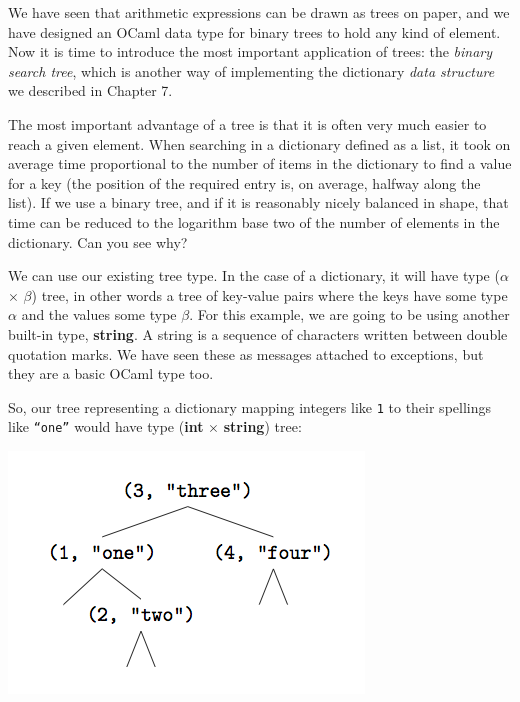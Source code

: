 \documentclass[]{book}
\newcommand{\smspace}{\vspace{4mm}}
\begin{document}
We have seen that arithmetic expressions can be drawn as trees on paper, and we have designed an OCaml data type for binary trees to hold any kind of element. Now it is time to introduce the most important application of trees: the \textit{binary search tree}, which is another way of implementing the dictionary \textit{data structure} we described in Chapter 7. 

The most important advantage of a tree is that it is often very much easier to reach a given element. When searching in a dictionary defined as a list, it took on average time proportional to the number of items in the dictionary to find a value for a key (the position of the required entry is, on average, halfway along the list). If we use a binary tree, and if it is reasonably nicely balanced in shape, that time can be reduced to the logarithm base two of the number of elements in the dictionary. Can you see why?

We can use our existing \textsf{tree} type. In the case of a dictionary, it will have type \textsf{\textmd{(}$\alpha$ $\times$ $\beta$\textmd{)} tree}, in other words a tree of key-value pairs where the keys have some type \textsf{$\alpha$} and the values some type \textsf{$\beta$}. For this example, we are going to be using another built-in type, \textsf{\textbf{string}}. A string is a sequence of characters written between double quotation marks. We have seen these as messages attached to exceptions, but they are a basic OCaml type too.

So, our tree representing a dictionary mapping integers like \texttt{1} to their spellings like \texttt{``one''} would have type \textsf{\textmd{(}\textbf{int} $\times$ \textbf{string}\textmd{)} tree}:

\smspace
\includegraphics{kindlefig4.png}
\smspace
\end{document}
